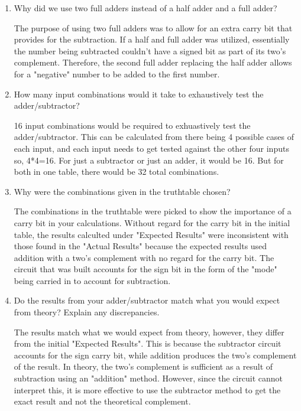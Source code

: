 \documentclass[11pt]{article}
\begin{document}
\begin{enumerate}
	
	
	\item Why did we use two full adders instead of a half adder and a full adder?
	
	The purpose of using two full adders was to allow for an extra carry bit that provides for the subtraction. If a half and full adder was utilized, essentially the number being subtracted couldn't have a signed bit as part of its two's complement. Therefore, the second full adder replacing the half adder allows for a "negative" number to be added to the first number. 
	
	\item How many input combinations would it take to exhaustively test the adder/subtractor?
	
	16 input combinations would be required to exhuastively test the adder/subtractor. This can be calculated from there being 4 possible cases of each input, and each input needs to get tested against the other four inputs so, 4*4=16. For just a subtractor or just an adder, it would be 16. But for both in one table, there would be 32 total combinations.
	
	\item Why  were  the  combinations  given  in  the  truthtable chosen? 
	
	The combinations in the truthtable were picked to show the importance of a carry bit in your calculations. Without regard for the carry bit in the initial table, the results calculted under "Expected Results" were inconsistent with those found in the "Actual Results" because the expected results used addition with a two's complement with no regard for the carry bit. The circuit that was built accounts for the sign bit in the form of the "mode" being carried in to account for subtraction.
	
	\item Do the results from your adder/subtractor match what  you  would  expect  from  theory?   Explain any discrepancies.
	
	The results match what we would expect from theory, however, they differ from the initial "Expected Results". This is because the subtractor circuit accounts for the sign carry bit, while addition produces the two's complement of the result. In theory, the two's complement is sufficient as a result of subtraction using an "addition" method. However, since the circuit cannot interpret this, it is more effective to use the subtractor method to get the exact result and not the theoretical complement.
	
\end{enumerate}
\end{document}
